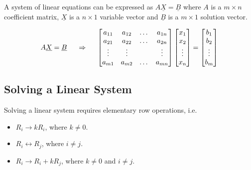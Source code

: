 \documentclass{article}
\begin{document}
A system of linear equations can be expressed as $A\underline{X} = \underline{B}$ where $A$ is a $m \times n$ coefficient matrix, $\underline{X}$ is a $n\times 1$ variable vector and $\underline{B}$ is a $m \times 1$ solution vector.

$$ A\underline{X} = \underline{B} \hspace{0.5cm} \Rightarrow \hspace{0.5cm}
\begin{bmatrix}
	a_{11} & a_{12} & \dots & a_{1n} \\
	a_{21} & a_{22} & \dots & a_{2n} \\
	\vdots & \vdots & & \vdots \\
	a_{m1} & a_{m2} & \dots & a_{mn} \\
\end{bmatrix}
\begin{bmatrix} x_1 \\ x_2 \\ \vdots \\ x_n \\ \end{bmatrix} =
\begin{bmatrix} b_1 \\ b_2 \\ \vdots \\ b_m \\ \end{bmatrix}
$$

\subsection{Solving a Linear System}

Solving a linear system requires elementary row operations, i.e.
\begin{itemize}
	\item $R_i \rightarrow kR_i$, where $k \not= 0$.
	\item $R_i \leftrightarrow R_j$, where $i \not= j$.
	\item $R_i \rightarrow R_i + kR_j$, where $k \not= 0$ and $i \not= j$.
\end{itemize}

\newpage
\end{document}
